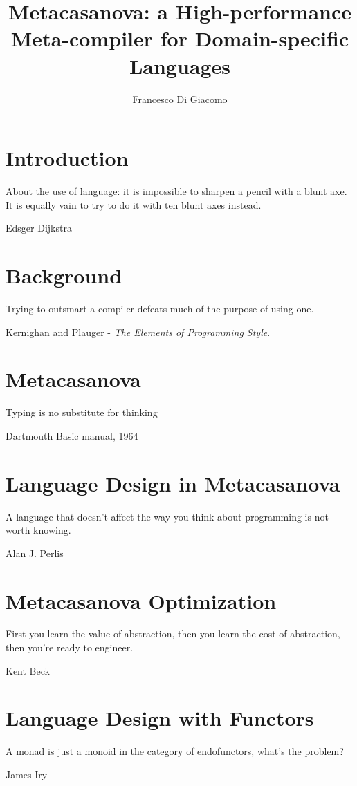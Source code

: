 \documentclass[9pt,a5paper,openright]{extbook}
\author{Francesco Di Giacomo}
\title{Metacasanova: a High-performance Meta-compiler for Domain-specific Languages}
\date { }
\theoremstyle{definition}
\begin{document}
\cleardoublepage
\thispagestyle{empty}
\frontmatter
{} %
\maketitle

\newpage

\newpage
\tableofcontents

\mainmatter
{}
\chapter{Introduction}
\label{ch:introduction}
\epigraph{About the use of language: it is impossible to sharpen a pencil with a blunt axe. It is equally vain to try to do it with ten blunt axes instead.}{Edsger Dijkstra}

	

\chapter{Background}
\label{ch:background}
\epigraph{Trying to outsmart a compiler defeats much of the purpose of using one.}{Kernighan and Plauger - \textit{The Elements of Programming Style}.}

	
\chapter{Metacasanova}
\label{ch:metacasanova}
\epigraph{Typing is no substitute for thinking}{Dartmouth Basic manual, 1964}
		

\chapter{Language Design in Metacasanova}
\label{ch:languages}
\epigraph{A language that doesn't affect the way you think about programming is not worth knowing.}{Alan J. Perlis}


\chapter{Metacasanova Optimization}
\label{ch:functors}
\epigraph{First you learn the value of abstraction, then you learn the cost of abstraction, then you're ready to engineer.}{Kent Beck}

	
\chapter{Language Design with Functors}
\label{ch:functor_languages}
\epigraph{A monad is just a monoid in the category of endofunctors, what's the problem?}{James Iry}

\end{document}
